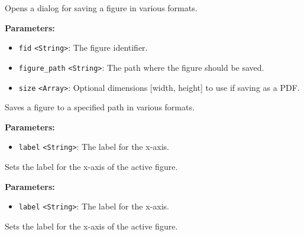 \documentclass[12pt,a4paper]{article}
\begin{document}
\noindent Opens a dialog for saving a figure in various formats.

\vspace{5mm}
\noindent {}


\noindent \textbf{Parameters:}
\begin{itemize}
  \item \texttt{fid} \texttt{<String>}: The figure identifier.
  \item \texttt{figure\_path} \texttt{<String>}: The path where the figure should be saved.
  \item \texttt{size} \texttt{<Array>}: Optional dimensions [width, height] to use if saving as a PDF.
\end{itemize}

\noindent Saves a figure to a specified path in various formats.

\vspace{5mm}
\noindent {}


\noindent \textbf{Parameters:}
\begin{itemize}
  \item \texttt{label} \texttt{<String>}: The label for the x-axis.
\end{itemize}

\noindent Sets the label for the x-axis of the active figure.

\vspace{5mm}
\noindent {}


\noindent \textbf{Parameters:}
\begin{itemize}
  \item \texttt{label} \texttt{<String>}: The label for the x-axis.
\end{itemize}

\noindent Sets the label for the x-axis of the active figure.

\vspace{5mm}
\noindent {}
\end{document}
